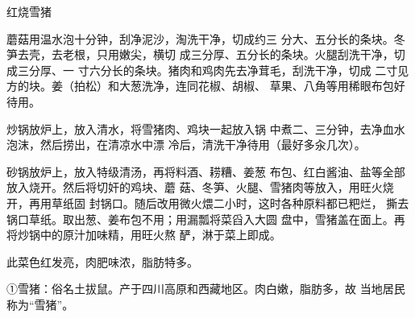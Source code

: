 \begin{recipe}{红烧雪猪}

\ingredients


\cooking

\step 蘑菇用温水泡十分钟，刮净泥沙，淘洗干净，切成约三 分大、五分长的条块。冬笋去壳，去老根，只用嫩尖，横切 成三分厚、五分长的条块。火腿刮洗干净，切成三分厚、一 寸六分长的条块。猪肉和鸡肉先去净茸毛，刮洗干净，切成 二寸见方的块。姜（拍松）和大葱洗净，连同花椒、胡椒、 草果、八角等用稀眼布包好待用。

\step 炒锅放炉上，放入清水，将雪猪肉、鸡块一起放入锅
中煮二、三分钟，去净血水泡沫，然后捞出，在清凉水中漂 冷后，清洗干净待用（最好多汆几次）。

\step 砂锅放炉上，放入特级清汤，再将料酒、耢糟、姜葱 布包、红白酱油、盐等全部放入烧开。然后将切奸的鸡块、蘑 菇、冬笋、火腿、雪猪肉等放入，用旺火烧开，再用草纸固 封锅口。随后改用微火煨二小时，这时各种原料都已粑烂， 撕去锅口草纸。取出葱、姜布包不用；用漏瓢将菜舀入大圆
盘中，雪猪盖在面上。再将炒锅中的原汁加味精，用旺火熬 酽，淋于菜上即成。

\notes

此菜色红发亮，肉肥味浓，脂肪特多。

①雪猪：俗名土拔鼠。产于四川高原和西藏地区。肉白嫩，脂肪多，故 当地居民称为“雪猪”。

\end{recipe}

